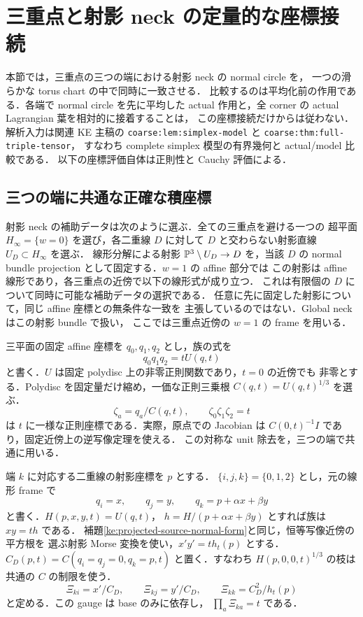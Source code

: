 \section{三重点と射影 neck の定量的な座標接続}
\label{ke:neck-corner-transition-section}

本節では，三重点の三つの端における射影 neck の normal circle を，
一つの滑らかな torus chart の中で同時に一致させる．
比較するのは平均化前の作用である．各端で normal circle を先に平均した
actual 作用と，全 corner の actual Lagrangian 葉を相対的に接着することは，
この座標接続だけからは従わない．
解析入力は関連 KE 主稿\cite{KELocalCurrent}の
\texttt{coarse:lem:simplex-model} と \texttt{coarse:thm:full-triple-tensor}，
すなわち complete simplex 模型の有界幾何と actual/model 比較である．
以下の座標評価自体は正則性と Cauchy 評価による．

\subsection{三つの端に共通な正確な積座標}

射影 neck の補助データは次のように選ぶ．全ての三重点を避ける一つの
超平面 $H_\infty=\{w=0\}$ を選び，各二重線 $D$ に対して
$D$ と交わらない射影直線 $U_D\subset H_\infty$ を選ぶ．
線形分解による射影 $\mathbb P^3\setminus U_D\to D$ を，当該 $D$ の
normal bundle projection として固定する．$w=1$ の affine 部分では
この射影は affine 線形であり，各三重点の近傍で以下の線形式が成り立つ．
これは有限個の $D$ について同時に可能な補助データの選択である．
任意に先に固定した射影について，同じ affine 座標との無条件な一致を
主張しているのではない．Global neck はこの射影 bundle で扱い，
ここでは三重点近傍の $w=1$ の frame を用いる．

三平面の固定 affine 座標を $q_0,q_1,q_2$ とし，族の式を
\[
 q_0q_1q_2=tU(q,t)
\]
と書く．$U$ は固定 polydisc 上の非零正則関数であり，$t=0$ の近傍でも
非零とする．Polydisc を固定量だけ縮め，一価な正則三乗根
$C(q,t)=U(q,t)^{1/3}$ を選ぶ．
\[
 \zeta_a=q_a/C(q,t),\qquad \zeta_0\zeta_1\zeta_2=t
\]
は $t$ に一様な正則座標である．実際，原点での Jacobian は
$C(0,t)^{-1}I$ であり，固定近傍上の逆写像定理を使える．
この対称な unit 除去を，三つの端で共通に用いる．

端 $k$ に対応する二重線の射影座標を $p$ とする．
$\{i,j,k\}=\{0,1,2\}$ とし，元の線形 frame で
\[
 q_i=x,\qquad q_j=y,\qquad q_k=p+\alpha x+\beta y
\]
と書く．$H(p,x,y,t)=U(q,t)$，
$h=H/(p+\alpha x+\beta y)$ とすれば族は $xy=th$ である．
補題\ref{ke:projected-source-normal-form}と同じ，恒等写像近傍の平方根を
選ぶ射影 Morse 変換を使い，$x'y'=t h_t(p)$ とする．
$C_D(p,t)=C(q_i=q_j=0,q_k=p,t)$ と置く．すなわち
$H(p,0,0,t)^{1/3}$ の枝は共通の $C$ の制限を使う．
\begin{equation}\label{ke:eq:arm-gauged-coordinates}
 \Xi_{ki}=x'/C_D,\qquad
 \Xi_{kj}=y'/C_D,\qquad
 \Xi_{kk}=C_D^2/h_t(p)
\end{equation}
と定める．この gauge は base のみに依存し，
$\prod_a\Xi_{ka}=t$ である．

